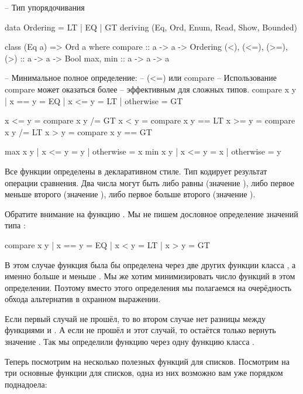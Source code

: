 \begin{code}
-- Тип упорядочивания

data  Ordering  =  LT | EQ | GT
          deriving (Eq, Ord, Enum, Read, Show, Bounded)


class  (Eq a) => Ord a  where
    compare              :: a -> a -> Ordering
    (<), (<=), (>=), (>) :: a -> a -> Bool
    max, min             :: a -> a -> a

        -- Минимальное полное определение:
        --      (<=) или compare
        -- Использование compare может оказаться более 
        -- эффективным для сложных типов.
    compare x y
         | x == y    =  EQ
         | x <= y    =  LT
         | otherwise =  GT

    x <= y           =  compare x y /= GT
    x <  y           =  compare x y == LT
    x >= y           =  compare x y /= LT
    x >  y           =  compare x y == GT

    max x y 
         | x <= y    =  y
         | otherwise =  x
    min x y
         | x <= y    =  x
         | otherwise =  y
\end{code}


Все функции определены в декларативном стиле. Тип  
кодирует результат операции сравнения. Два числа могут быть либо равны
(значение ), либо первое меньше второго (значение ),
либо первое больше второго (значение ).

Обратите внимание на функцию . Мы не пишем дословное
определение значений типа :

\begin{code}
    compare x y
         | x == y    =  EQ
         | x <  y    =  LT
         | x >  y    =  GT
\end{code}

В этом случае функция  была бы определена через 
две других функции класса  , а именно больше \In{>}
и меньше \In{<}. Мы же хотим минимизировать число функций
в этом определении. Поэтому вместо этого определения
мы полагаемся на очерёдность обхода альтернатив в охранном
выражении.

Если первый случай не прошёл, то во втором случае нет разницы
между функциями \In{<} и \In{<=}. А если не прошёл и этот случай, 
то остаётся только вернуть значение . Так мы определили
функцию  через одну функцию класса .

Теперь посмотрим на несколько полезных функций для списков.
Посмотрим на три основные функции для списков, одна из них
возможно вам уже порядком поднадоела:

